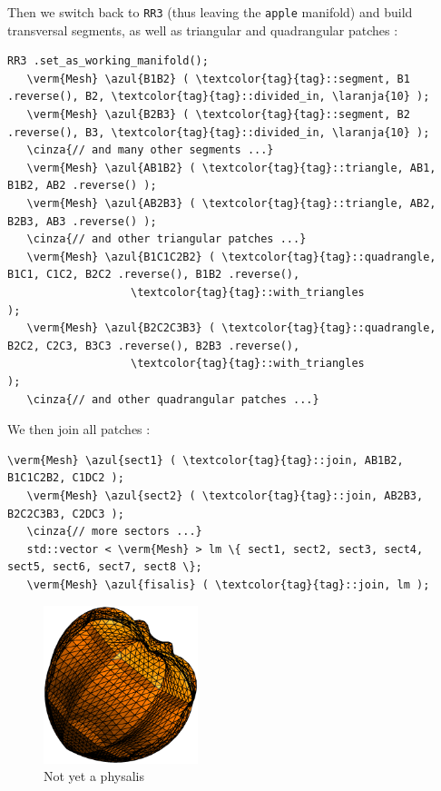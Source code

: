 Then we switch back to {\small\tt RR3} (thus leaving the {\small\tt apple} manifold) and build
transversal segments, as well as triangular and quadrangular patches :

\begin{Verbatim}[commandchars=\\\{\},formatcom=\small\tt,frame=single,
   label=parag-\ref{\numb section 2.\numb parag 11}.cpp,rulecolor=\color{coment},
   baselinestretch=0.94,framesep=2mm]
   RR3 .set_as_working_manifold();
   \verm{Mesh} \azul{B1B2} ( \textcolor{tag}{tag}::segment, B1 .reverse(), B2, \textcolor{tag}{tag}::divided_in, \laranja{10} );
   \verm{Mesh} \azul{B2B3} ( \textcolor{tag}{tag}::segment, B2 .reverse(), B3, \textcolor{tag}{tag}::divided_in, \laranja{10} );
   \cinza{// and many other segments ...}
   \verm{Mesh} \azul{AB1B2} ( \textcolor{tag}{tag}::triangle, AB1, B1B2, AB2 .reverse() );
   \verm{Mesh} \azul{AB2B3} ( \textcolor{tag}{tag}::triangle, AB2, B2B3, AB3 .reverse() );
   \cinza{// and other triangular patches ...}
   \verm{Mesh} \azul{B1C1C2B2} ( \textcolor{tag}{tag}::quadrangle, B1C1, C1C2, B2C2 .reverse(), B1B2 .reverse(),
                   \textcolor{tag}{tag}::with_triangles                                           );
   \verm{Mesh} \azul{B2C2C3B3} ( \textcolor{tag}{tag}::quadrangle, B2C2, C2C3, B3C3 .reverse(), B2B3 .reverse(),
                   \textcolor{tag}{tag}::with_triangles                                           );
   \cinza{// and other quadrangular patches ...}   
\end{Verbatim}

We then join all patches :
\begin{Verbatim}[commandchars=\\\{\},formatcom=\small\tt,frame=single,
   label=parag-\ref{\numb section 2.\numb parag 11}.cpp,rulecolor=\color{coment},
   baselinestretch=0.94,framesep=2mm]
   \verm{Mesh} \azul{sect1} ( \textcolor{tag}{tag}::join, AB1B2, B1C1C2B2, C1DC2 );
   \verm{Mesh} \azul{sect2} ( \textcolor{tag}{tag}::join, AB2B3, B2C2C3B3, C2DC3 );
   \cinza{// more sectors ...}
   std::vector < \verm{Mesh} > lm \{ sect1, sect2, sect3, sect4, sect5, sect6, sect7, sect8 \};
   \verm{Mesh} \azul{fisalis} ( \textcolor{tag}{tag}::join, lm ); 
\end{Verbatim}

\begin{figure}[ht] \centering
  \includegraphics[width=45mm]{fisalis-round}
  \caption{Not yet a physalis}
  \label{\numb section 2.\numb fig 13}
\end{figure}

